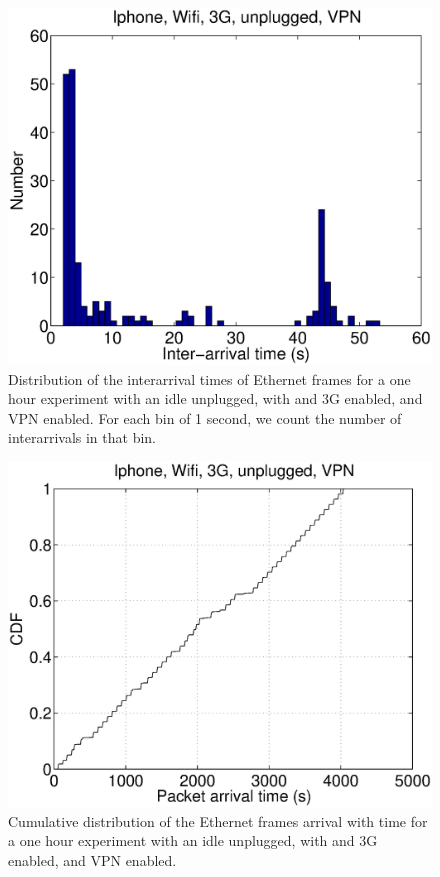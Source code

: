 \begin{figure}
\centering
        \includegraphics[width=0.8\linewidth]{../../code/pushNotification/Fig/bw_iphone_wifi_3g_unplug_vpn_interTs.eps}
  \caption{Distribution of the interarrival times of Ethernet frames
    for a one hour experiment with an idle \iphone{} unplugged, with \wifi{} and 3G
    enabled, and VPN enabled. For each bin of 1 second, we count
    the number of interarrivals in that bin.}
  \label{fig:push_w3v_interTs}
\end{figure}

\begin{figure}
\centering
        \includegraphics[width=0.8\linewidth]{../../code/pushNotification/Fig/bw_iphone_wifi_3g_unplug_vpn_ts.eps}
  \caption{Cumulative distribution of the Ethernet frames
          arrival with time for a one hour experiment with an idle
          \iphone{} unplugged, with \wifi{} and 3G enabled, and VPN
          enabled.}
  \label{fig:push_w3v_ts}
\end{figure}




